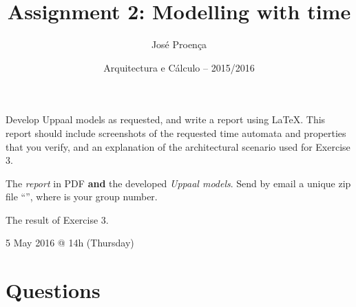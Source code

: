 \documentclass[11pt]{article}
\date{Arquitectura e C\'alculo -- 2015/2016}
\begin{document}
 
 
\title{Assignment 2: Modelling with time}
\author{Jos\'{e} Proen\c{c}a}
 
\maketitle

 Develop Uppaal models as requested, and write a report using LaTeX. This report should include screenshots of the requested time automata and properties that you verify, and an explanation of the architectural scenario used for Exercise 3.

 The \emph{report} in PDF \textbf{and} the developed \emph{Uppaal models}. Send by email a unique zip file ``'', where  is your group number.

 The result of Exercise 3.

 5 May 2016 @ 14h (Thursday)
 
\section*{Questions}

%
%
%
%
%
\end{document}
